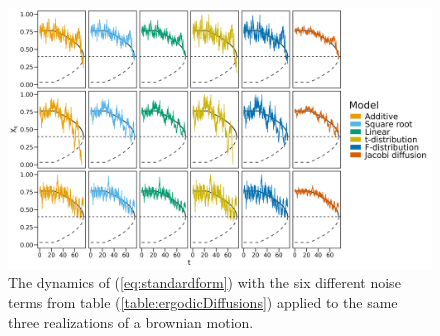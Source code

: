\begin{figure}[h]
    \begin{center}
        \includegraphics[scale = .1]{figures/sample_paths_plot_small_scale.jpeg}
        \caption{The dynamics of (\ref{eq:standardform}) with the six different noise terms from table (\ref{table:ergodicDiffusions}) applied to the same three realizations of a brownian motion.}
        \label{figure:samplesFromAllDifferentModels}
    \end{center}
\end{figure}\\
